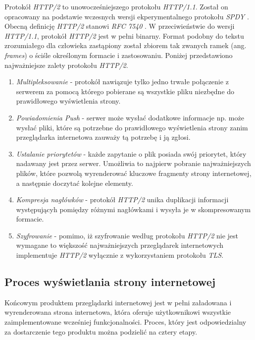 \documentclass[polish, twoside, 12pt]{mwart}
\begin{document}
Protokół \emph{HTTP/2} to unowocześniejszego protokołu \emph{HTTP/1.1}. Został on opracowany na podstawie wczesnych wersji ekperymentalnego protokołu \emph{SPDY} \cite{spdy}. Obecną definicję \emph{HTTP/2} stanowi \emph{RFC 7540} \cite{rfc7540}. W przeciwieństwie do wersji \emph{HTTP/1.1}, protokół \emph{HTTP/2} jest w pełni binarny. Format podobny do tekstu zrozumiałego dla człowieka zastąpiony został zbiorem tak zwanych ramek (ang. \emph{frames}) o ściśle określonym formacie i zastosowaniu. Poniżej przedstawiono najważniejsze zalety protokołu \emph{HTTP/2}.

\begin{enumerate}
  \item \emph{Multipleksowanie} - protokół nawiązuje tylko jedno trwałe połączenie z serwerem za pomocą którego pobierane są wszystkie pliku niezbędne do prawidłowego wyświetlenia strony.
  \item \emph{Powiadomienia Push} - serwer może wysłać dodatkowe informacje np. może wysłać pliki, które są potrzebne do prawidłowego wyświetlenia strony zanim przeglądarka internetowa zauważy tą potrzebę i ją zgłosi.
  \item \emph{Ustalanie priorytetów} - każde zapytanie o plik posiada swój priorytet, który nadawany jest przez serwer. Umożliwia to najpierw pobranie najważniejszych plików, które pozwolą wyrenderować kluczowe fragmenty strony internetowej, a następnie doczytać kolejne elementy.
  \item \emph{Kompresja nagłówków} - protokół \emph{HTTP/2} unika duplikacji informacji występującyh pomiędzy różnymi nagłówkami i wysyła je w skompresowanym formacie.
  \item \emph{Szyfrowanie} - pomimo, iż szyfrowanie według protokołu \emph{HTTP/2} nie jest wymagane to większość najważniejszych przeglądarek internetowych implementuje \emph{HTTP/2} wyłącznie z wykorzystaniem protokołu \emph{TLS}.
\end{enumerate}

\subsection{Proces wyświetlania strony internetowej}

Końcowym produktem przeglądarki internetowej jest w pełni załadowana i wyrenderowana strona internetowa, która oferuje użytkownikowi wszystkie zaimplementowane wcześniej funkcjonalności. Proces, który jest odpowiedzialny za dostarczenie tego produktu można podzielić na cztery etapy.
\end{document}

